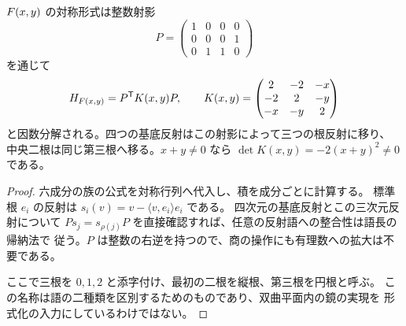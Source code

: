 \begin{proposition}[族の整数三根商]
\label{bp:family-quotient}
\leanok
\(F(x,y)\) の対称形式は整数射影
\[
 P=\begin{pmatrix}1&0&0&0\\0&0&0&1\\0&1&1&0\end{pmatrix}
\]
を通じて
\[
 H_{F(x,y)}=P^{\mathsf T}K(x,y)P,
 \qquad
 K(x,y)=\begin{pmatrix}2&-2&-x\\-2&2&-y\\-x&-y&2\end{pmatrix}
\]
と因数分解される。四つの基底反射はこの射影によって三つの根反射に移り、
中央二根は同じ第三根へ移る。\(x+y\ne0\) なら
\(\det K(x,y)=-2(x+y)^2\ne0\) である。
\end{proposition}
\begin{proof}
\leanok
六成分の族の公式を対称行列へ代入し、積を成分ごとに計算する。
標準根 \(e_i\) の反射は
\(s_i(v)=v-\langle v,e_i\rangle e_i\) である。
四次元の基底反射とこの三次元反射について
\(Ps_j=s_{\rho(j)}P\) を直接確認すれば、任意の反射語への整合性は語長の帰納法で
従う。\(P\) は整数の右逆を持つので、商の操作にも有理数への拡大は不要である。

ここで三根を \(0,1,2\) と添字付け、最初の二根を縦根、第三根を円根と呼ぶ。
この名称は語の二種類を区別するためのものであり、双曲平面内の鏡の実現を
形式化の入力にしているわけではない。
\end{proof}

